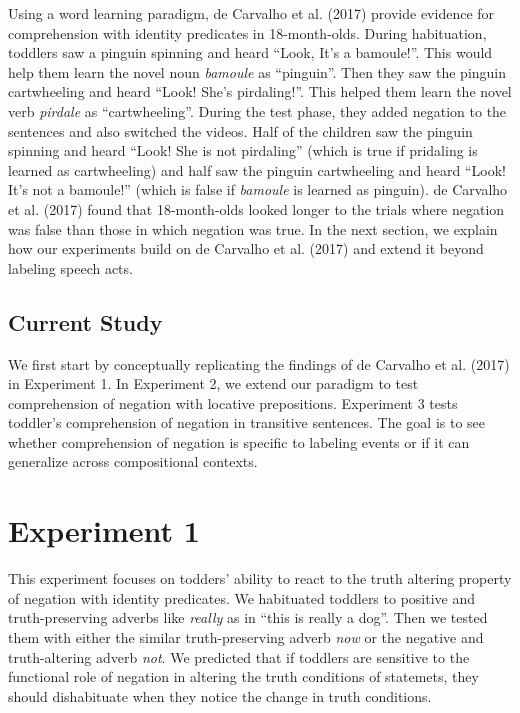 \documentclass[man,floatsintext]{apa6}
\begin{document}
Using a word learning paradigm, de Carvalho et al. (2017) provide evidence for comprehension with identity predicates in 18-month-olds. During habituation, toddlers saw a pinguin spinning and heard \enquote{Look, It's a bamoule!}. This would help them learn the novel noun \emph{bamoule} as \enquote{pinguin}. Then they saw the pinguin cartwheeling and heard \enquote{Look! She's pirdaling!}. This helped them learn the novel verb \emph{pirdale} as \enquote{cartwheeling}. During the test phase, they added negation to the sentences and also switched the videos. Half of the children saw the pinguin spinning and heard \enquote{Look! She is not pirdaling} (which is true if pridaling is learned as cartwheeling) and half saw the pinguin cartwheeling and heard \enquote{Look! It's not a bamoule!} (which is false if \emph{bamoule} is learned as pinguin). de Carvalho et al. (2017) found that 18-month-olds looked longer to the trials where negation was false than those in which negation was true. In the next section, we explain how our experiments build on de Carvalho et al. (2017) and extend it beyond labeling speech acts.

\hypertarget{current-study}{%
\subsection{Current Study}\label{current-study}}

We first start by conceptually replicating the findings of de Carvalho et al. (2017) in Experiment 1. In Experiment 2, we extend our paradigm to test comprehension of negation with locative prepositions. Experiment 3 tests toddler's comprehension of negation in transitive sentences. The goal is to see whether comprehension of negation is specific to labeling events or if it can generalize across compositional contexts.

\hypertarget{experiment-1}{%
\section{Experiment 1}\label{experiment-1}}

This experiment focuses on todders' ability to react to the truth altering property of negation with identity predicates. We habituated toddlers to positive and truth-preserving adverbs like \emph{really} as in \enquote{this is really a dog}. Then we tested them with either the similar truth-preserving adverb \emph{now} or the negative and truth-altering adverb \emph{not}. We predicted that if toddlers are sensitive to the functional role of negation in altering the truth conditions of statemets, they should dishabituate when they notice the change in truth conditions.
\end{document}
